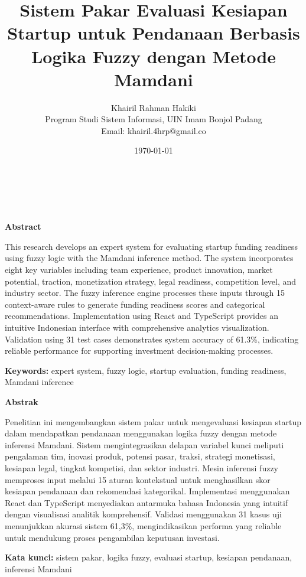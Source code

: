 \documentclass[12pt,a4paper]{article}
\title{Sistem Pakar Evaluasi Kesiapan Startup untuk Pendanaan Berbasis Logika Fuzzy dengan Metode Mamdani}
\author{%
    \small Khairil Rahman Hakiki\\
    \small Program Studi Sistem Informasi, UIN Imam Bonjol Padang\\
    \small Email: khairil.4hrp@gmail.co
}
\date{\small \today}
\makeatletter
\renewcommand{\maketitle}{%
    \begin{center}
        {\Large\textbf{\@title}}\\[0.3cm]
        {\normalsize\@author}\\[0.2cm]
        {\small\@date}
    \end{center}
    \vspace{1cm} %
}
\makeatother
\begin{document}
\maketitle

\begin{center}
    \textbf{Abstract}
\end{center}

\noindent This research develops an expert system for evaluating startup funding readiness using fuzzy logic with the Mamdani inference method. The system incorporates eight key variables including team experience, product innovation, market potential, traction, monetization strategy, legal readiness, competition level, and industry sector. The fuzzy inference engine processes these inputs through 15 context-aware rules to generate funding readiness scores and categorical recommendations. Implementation using React and TypeScript provides an intuitive Indonesian interface with comprehensive analytics visualization. Validation using 31 test cases demonstrates system accuracy of 61.3\%, indicating reliable performance for supporting investment decision-making processes.

\textbf{Keywords:} expert system, fuzzy logic, startup evaluation, funding readiness, Mamdani inference

\vspace{1cm} %

\begin{center}
    \textbf{Abstrak}
\end{center}

\noindent Penelitian ini mengembangkan sistem pakar untuk mengevaluasi kesiapan startup dalam mendapatkan pendanaan menggunakan logika fuzzy dengan metode inferensi Mamdani. Sistem mengintegrasikan delapan variabel kunci meliputi pengalaman tim, inovasi produk, potensi pasar, traksi, strategi monetisasi, kesiapan legal, tingkat kompetisi, dan sektor industri. Mesin inferensi fuzzy memproses input melalui 15 aturan kontekstual untuk menghasilkan skor kesiapan pendanaan dan rekomendasi kategorikal. Implementasi menggunakan React dan TypeScript menyediakan antarmuka bahasa Indonesia yang intuitif dengan visualisasi analitik komprehensif. Validasi menggunakan 31 kasus uji menunjukkan akurasi sistem 61,3\%, mengindikasikan performa yang reliable untuk mendukung proses pengambilan keputusan investasi.

\textbf{Kata kunci:} sistem pakar, logika fuzzy, evaluasi startup, kesiapan pendanaan, inferensi Mamdani
\end{document}
